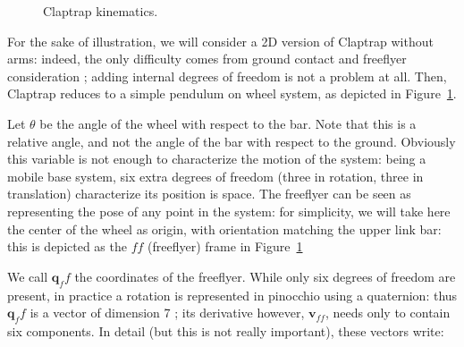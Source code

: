 \documentclass[a4paper,11pt]{article}
\begin{document}
\begin{figure}
	\centering
	\caption{Claptrap kinematics.}
	\label{fModel}
\end{figure}

For the sake of illustration, we will consider a 2D version of Claptrap without arms: indeed, the only difficulty comes from ground contact and freeflyer consideration ; adding internal degrees of freedom is not a problem at all. Then, Claptrap reduces to a simple pendulum on wheel system, as depicted in Figure~\ref{fModel}.

Let $\theta$ be the angle of the wheel with respect to the bar. Note that this is a relative angle, and not the angle of the bar with respect to the ground. Obviously this variable is not enough to characterize the motion of the system: being a mobile base system, six extra degrees of freedom (three in rotation, three in translation) characterize its position is space. The freeflyer can be seen as representing the pose of any point in the system: for simplicity, we will take here the center of the wheel as origin, with orientation matching the upper link bar: this is depicted as the $ff$ (freeflyer) frame in Figure~\ref{fModel}

We call $\bm q_ff$ the coordinates of the freeflyer. While only six degrees of freedom are present, in practice a rotation is represented in pinocchio using a quaternion: thus $\bm q_ff$ is a vector of dimension 7 ; its derivative however, $\bm v_{ff}$, needs only to contain six components. In detail (but this is not really important), these vectors write:
\end{document}

